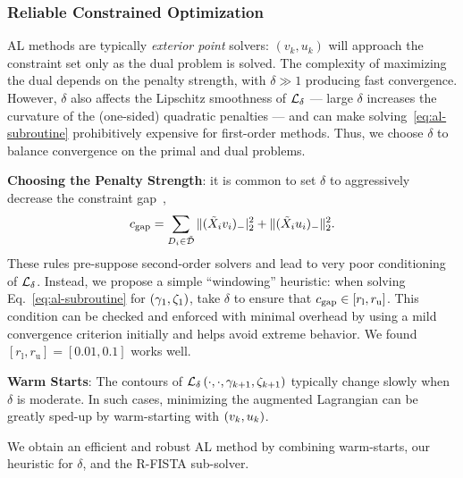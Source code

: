 \subsubsection{Reliable Constrained Optimization}\label{sec:reliable-co}

AL methods are typically \emph{exterior point} solvers: \( (v_k, u_k) \) will approach the constraint set only as the dual problem is solved.
The complexity of maximizing the dual depends on the penalty strength, with \( \delta \gg 1 \) producing fast convergence.
However, \( \delta \) also affects the Lipschitz smoothness of \( \mathcal{L}_\delta \) --- large \( \delta \) increases the curvature of the (one-sided) quadratic penalties --- and can make solving~\eqref{eq:al-subroutine} prohibitively expensive for first-order methods.
Thus, we choose \( \delta \) to balance convergence on the primal and dual problems.

\textbf{Choosing the Penalty Strength}:
it is common to set \( \delta \) to aggressively decrease the constraint gap~\citep{conn2013lancelot, murtagh1983minos},
\[ c_{\text{gap}} = \sum_{D_i \in \tilde {\mathcal{D}}} \|(\tilde X_i v_i)_-|^2_2 + \|(\tilde X_i u_i)_-\|^2_2. \]
These rules pre-suppose second-order solvers and lead to very poor conditioning of \( \mathcal{L}_\delta \).
Instead, we propose a simple ``windowing'' heuristic:
when solving Eq.~\ref{eq:al-subroutine} for \( \left(\gamma_1, \zeta_1\right) \), take \( \delta \) to ensure that \( c_{\text{gap}} \in \left[r_{\text{l}}, r_{\text{u}}\right] \).
This condition can be checked and enforced with minimal overhead by using a mild convergence criterion initially and helps avoid extreme behavior.
We found \( [r_{\text{l}}, r_{\text{u}}] = [0.01, 0.1] \) works well.

\textbf{Warm Starts}: The contours of \( \mathcal{L}_\delta\left(\cdot, \cdot, \gamma_{k+1}, \zeta_{k+1}\right) \) typically change slowly when \( \delta \) is moderate.
In such cases, minimizing the augmented Lagrangian can be greatly sped-up by warm-starting with \( \left(v_k, u_k\right) \).

We obtain an efficient and robust AL method by combining warm-starts, our heuristic for \( \delta \), and the R-FISTA sub-solver.

